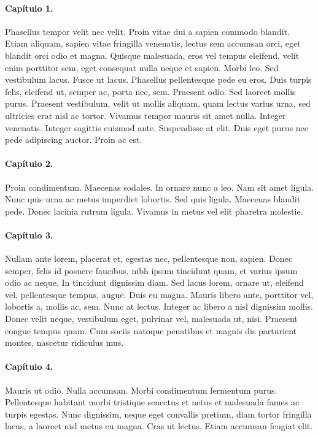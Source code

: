 \paragraph*{Capítulo 1.}
Phasellus tempor velit nec velit. Proin vitae dui a sapien commodo blandit. Etiam aliquam, sapien vitae fringilla venenatis, lectus sem accumsan orci, eget blandit orci odio et magna. Quisque malesuada, eros vel tempus eleifend, velit enim porttitor sem, eget consequat nulla neque et sapien. Morbi leo. Sed vestibulum lacus. Fusce ut lacus. Phasellus pellentesque pede eu eros. Duis turpis felis, eleifend ut, semper ac, porta nec, sem. Praesent odio. Sed laoreet mollis purus. Praesent vestibulum, velit ut mollis aliquam, quam lectus varius urna, sed ultricies erat nisl ac tortor. Vivamus tempor mauris sit amet nulla. Integer venenatis. Integer sagittis euismod ante. Suspendisse at elit. Duis eget purus nec pede adipiscing auctor. Proin ac est.

\paragraph*{Capítulo 2.}
Proin condimentum. Maecenas sodales. In ornare nunc a leo. Nam sit amet ligula. Nunc quis urna ac metus imperdiet lobortis. Sed quis ligula. Maecenas blandit pede. Donec lacinia rutrum ligula. Vivamus in metus vel elit pharetra molestie.

\paragraph*{Capítulo 3.}
Nullam ante lorem, placerat et, egestas nec, pellentesque non, sapien. Donec semper, felis id posuere faucibus, nibh ipsum tincidunt quam, et varius ipsum odio ac neque. In tincidunt dignissim diam. Sed lacus lorem, ornare ut, eleifend vel, pellentesque tempus, augue. Duis eu magna. Mauris libero ante, porttitor vel, lobortis a, mollis ac, sem. Nunc at lectus. Integer ac libero a nisl dignissim mollis. Donec velit neque, vestibulum eget, pulvinar vel, malesuada ut, nisi. Praesent congue tempus quam. Cum sociis natoque penatibus et magnis dis parturient montes, nascetur ridiculus mus.

\paragraph*{Capítulo 4.}
Mauris ut odio. Nulla accumsan. Morbi condimentum fermentum purus. Pellentesque habitant morbi tristique senectus et netus et malesuada fames ac turpis egestas. Nunc dignissim, neque eget convallis pretium, diam tortor fringilla lacus, a laoreet nisl metus eu magna. Cras ut lectus. Etiam accumsan feugiat elit.

